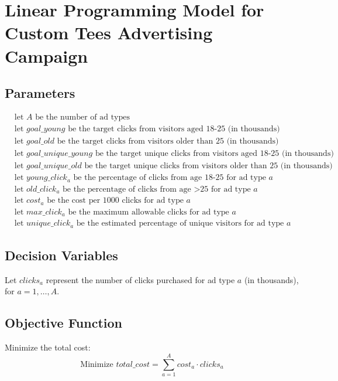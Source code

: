 \documentclass{article}
\begin{document}
\section*{Linear Programming Model for Custom Tees Advertising Campaign}

\subsection*{Parameters}
\begin{align*}
& \text{let } A \text{ be the number of ad types} \\
& \text{let } goal\_young \text{ be the target clicks from visitors aged 18-25 (in thousands)} \\
& \text{let } goal\_old \text{ be the target clicks from visitors older than 25 (in thousands)} \\
& \text{let } goal\_unique\_young \text{ be the target unique clicks from visitors aged 18-25 (in thousands)} \\
& \text{let } goal\_unique\_old \text{ be the target unique clicks from visitors older than 25 (in thousands)} \\
& \text{let } young\_click_{a} \text{ be the percentage of clicks from age 18-25 for ad type } a \\
& \text{let } old\_click_{a} \text{ be the percentage of clicks from age >25 for ad type } a \\
& \text{let } cost_{a} \text{ be the cost per 1000 clicks for ad type } a \\
& \text{let } max\_click_{a} \text{ be the maximum allowable clicks for ad type } a \\
& \text{let } unique\_click_{a} \text{ be the estimated percentage of unique visitors for ad type } a 
\end{align*}

\subsection*{Decision Variables}
Let \( clicks_a \) represent the number of clicks purchased for ad type \( a \) (in thousands), for \( a = 1, \ldots, A \).

\subsection*{Objective Function}
Minimize the total cost:
\[
\text{Minimize } total\_cost = \sum_{a=1}^{A} cost_a \cdot clicks_a
\]
\end{document}

